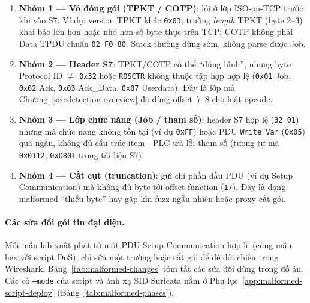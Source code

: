 \documentclass[../main.tex]{subfiles}
\begin{document}
\begin{enumerate}
    \item \textbf{Nhóm 1 --- Vỏ đóng gói (TPKT / COTP)}: lỗi ở lớp ISO-on-TCP trước khi vào S7. Ví dụ: version TPKT khác \texttt{0x03}; trường \emph{length} TPKT (byte 2--3) khai báo lớn hơn hoặc nhỏ hơn số byte thực trên TCP; COTP không phải Data TPDU chuẩn \texttt{02 F0 80}. Stack thường dừng sớm, không parse được Job.
    \item \textbf{Nhóm 2 --- Header S7}: TPKT/COTP có thể ``đúng hình'', nhưng byte Protocol ID $\neq$ \texttt{0x32} hoặc \texttt{ROSCTR} không thuộc tập hợp hợp lệ (\texttt{0x01} Job, \texttt{0x02} Ack, \texttt{0x03} Ack\_Data, \texttt{0x07} Userdata). Đây là lớp mà Chương~\ref{sec:detection-overview} đã dùng offset~7--8 cho luật opcode.
    \item \textbf{Nhóm 3 --- Lớp chức năng (Job / tham số)}: header S7 hợp lệ (\texttt{32 01}) nhưng mã chức năng không tồn tại (ví dụ \texttt{0xFF}) hoặc PDU \texttt{Write Var} (\texttt{0x05}) quá ngắn, không đủ cấu trúc item---PLC trả lỗi tham số (tương tự mã \texttt{0x0112}, \texttt{0xD801} trong tài liệu S7).
    \item \textbf{Nhóm 4 --- Cắt cụt (truncation)}: gửi chỉ phần đầu PDU (ví dụ Setup Communication) mà không đủ byte tới offset function (\texttt{17}). Đây là dạng malformed ``thiếu byte'' hay gặp khi fuzz ngẫu nhiên hoặc proxy cắt gói.
\end{enumerate}

\paragraph{Các sửa đổi gói tin đại diện.}

Mỗi mẫu lab xuất phát từ một PDU Setup Communication hợp lệ (cùng mẫu hex với script DoS), chỉ sửa một trường hoặc cắt gói để dễ đối chiếu trong Wireshark. Bảng~\ref{tab:malformed-changes} tóm tắt các sửa đổi dùng trong đồ án. Các cờ \texttt{--mode} của script và ánh xạ SID Suricata nằm ở Phụ lục~\ref{app:malformed-script-deploy} (Bảng~\ref{tab:malformed-phases}).
\end{document}
